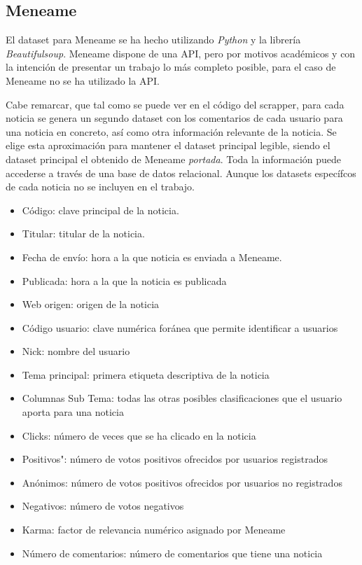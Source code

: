 \documentclass[a4paper,12pt]{article}
\begin{document}
\subsection{Meneame}

El dataset para Meneame se ha hecho utilizando {\itshape Python} y la librer\'ia {\itshape Beautifulsoup}. Meneame dispone de una API, pero por motivos acad\'emicos y con la intenci\'on de presentar un trabajo lo m\'as completo posible, para el caso de Meneame no se ha utilizado la API.

Cabe remarcar, que tal como se puede ver en el c\'odigo del scrapper, para cada noticia se genera un segundo dataset con los comentarios de cada usuario para una noticia en concreto, as\'i como otra informaci\'on relevante de la noticia. Se elige esta aproximaci\'on para mantener el dataset principal legible, siendo el dataset principal el obtenido de Meneame {\itshape portada}. Toda la informaci\'on puede accederse a trav\'es de una base de datos relacional. Aunque los datasets espec\'ifcos de cada noticia no se incluyen en el trabajo.

 
\begin{itemize}

\item C\'odigo: clave principal de la noticia.
\item Titular: titular de la noticia.
\item Fecha de env\'io: hora a la que noticia es enviada a Meneame.
\item Publicada: hora a la que la noticia es publicada
\item Web origen: origen de la noticia
\item C\'odigo usuario: clave num\'erica for\'anea que permite identificar a usuarios
\item Nick: nombre del usuario
\item Tema principal: primera etiqueta descriptiva de la noticia
\item Columnas Sub Tema: todas las otras posibles clasificaciones que el usuario aporta para una noticia
\item  Clicks: n\'umero de veces que se ha clicado en la noticia
\item Positivos": n\'umero de votos positivos ofrecidos por usuarios registrados
\item An\'onimos: n\'umero de votos positivos ofrecidos por usuarios no registrados
\item Negativos: n\'umero de votos negativos
\item Karma: factor de relevancia num\'erico asignado por Meneame
\item N\'umero de comentarios: n\'umero de comentarios que tiene una noticia

\end{itemize}
\end{document}
